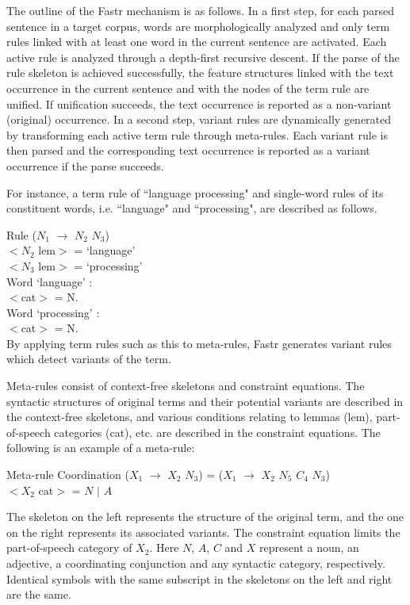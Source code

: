 The outline of the Fastr mechanism is as follows. In a first step, for each parsed sentence in a target corpus, words are morphologically analyzed and only term rules linked with at least one word in the current sentence are activated. Each active rule is analyzed through a depth-first recursive descent. If the parse of the rule skeleton is achieved successfully, the feature structures linked with the text occurrence in the current sentence and with the nodes of the term rule are unified. If unification succeeds, the text occurrence is reported as a non-variant (original) occurrence. In a second step, variant rules are dynamically generated by transforming each active term rule through meta-rules. Each variant rule is then parsed and the corresponding text occurrence is reported as a variant occurrence if the parse succeeds.

For instance, a term rule of ``language processing" and single-word rules of its constituent words, i.e. ``language" and ``processing", are described as follows.

\vspace*{5mm}
\noindent
Rule ($N_1$ $\rightarrow$ $N_2$ $N_3$)\\
$<N_2$ lem$>$ = `language'\\
$<N_3$ lem$>$ = `processing'\\

\noindent
Word `language' :\\
$<$cat$>$ = N.\\
Word `processing' :\\
$<$cat$>$ = N.\\

\noindent
By applying term rules such as this to meta-rules, Fastr generates variant rules which detect variants of the term.

Meta-rules consist of context-free skeletons and constraint equations. The syntactic structures of original terms and their potential variants are described in the context-free skeletons, and various conditions relating to lemmas (lem), part-of-speech categories (cat), etc. are described in the constraint equations. The following is an example of a meta-rule:

\vspace*{5mm}
\noindent
Meta-rule Coordination ($X_1$ $\rightarrow$ $X_2$ $N_3$) = ($X_1$ $\rightarrow$ $X_2$ $N_5$ $C_4$ $N_3$)\\
$<X_2$ cat$>$ = $N$ $|$ $A$
\vspace*{5mm}

\noindent
The skeleton on the left represents the structure of the original term, and the one on the right represents its associated variants. The constraint equation limits the part-of-speech category of $X_2$. Here $N$, $A$, $C$ and $X$ represent a noun, an adjective, a coordinating conjunction and any syntactic category, respectively. Identical symbols with the same subscript in the skeletons on the left and right are the same.

